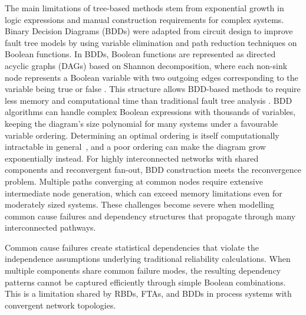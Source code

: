 \documentclass[preprint,12pt]{elsarticle}
\begin{document}
The main limitations of tree-based methods stem from exponential growth in logic expressions and manual construction requirements for complex systems. Binary Decision Diagrams (BDDs)\cite{rauzy_new_1993,bryant_graph-based_1986, brace_efficient_1990} were adapted from circuit design to improve fault tree models by using variable elimination and path reduction techniques on Boolean functions. In BDDs, Boolean functions are represented as directed acyclic graphs (DAGs) based on Shannon decomposition, where each non-sink node represents a Boolean variable with two outgoing edges corresponding to the variable being true or false \cite{xing_fault_2008}. This structure allows BDD-based methods to require less memory and computational time than traditional fault tree analysis \cite{rauzy_new_1993}.
BDD algorithms can handle complex Boolean expressions with thousands of variables, keeping the diagram's size polynomial for many systems under a favourable variable ordering. Determining an optimal ordering is itself computationally intractable in general~\cite{bryant_ordered_nodate}, and a poor ordering can make the diagram grow exponentially instead. For highly interconnected networks with shared components and reconvergent fan-out, BDD construction meets the reconvergence problem. Multiple paths converging at common nodes require extensive intermediate node generation, which can exceed memory limitations even for moderately sized systems. These challenges become severe when modelling common cause failures and dependency structures that propagate through many interconnected pathways.

Common cause failures create statistical dependencies that violate the independence assumptions underlying traditional reliability calculations\cite{mosleh_estimation_nodate}. When multiple components share common failure modes, the resulting dependency patterns cannot be captured efficiently through simple Boolean combinations. This is a limitation shared by RBDs, FTAs, and BDDs in process systems with convergent network topologies.
\end{document}
